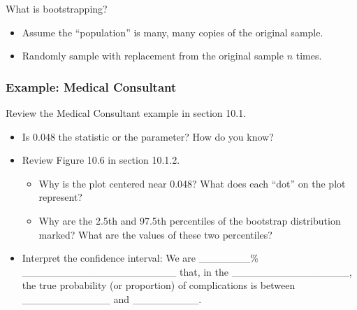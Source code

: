 \documentclass[
]{report}
\providecommand{\tightlist}{%
  \setlength{\itemsep}{0pt}\setlength{\parskip}{0pt}}
\begin{document}
What is bootstrapping?

\begin{itemize}
\item
  Assume the ``population'' is many, many copies of the original sample.
\item
  Randomly sample with replacement from the original sample \(n\) times.
\end{itemize}

\subsubsection*{Example: Medical Consultant}\label{example-medical-consultant}

Review the Medical Consultant example in section 10.1.

\begin{itemize}
\tightlist
\item
  Is 0.048 the statistic or the parameter? How do you know?
\end{itemize}

\vspace{0.4in}

\begin{itemize}
\item
  Review Figure 10.6 in section 10.1.2.

  \begin{itemize}
  \tightlist
  \item
    Why is the plot centered near 0.048? What does each ``dot'' on the plot represent?
  \end{itemize}

  \vspace{0.4in}

  \begin{itemize}
  \tightlist
  \item
    Why are the 2.5th and 97.5th percentiles of the bootstrap distribution marked? What are the values of these two percentiles?
  \end{itemize}

  \vspace{0.3in}
\end{itemize}


\begin{itemize}
\tightlist
\item
  Interpret the confidence interval: We are \_\_\_\_\_\_\_\% \_\_\_\_\_\_\_\_\_\_\_\_\_\_\_\_\_\_\_\_\_ that, in the \_\_\_\_\_\_\_\_\_\_\_\_\_\_\_\_, the true probability (or proportion) of complications is between \_\_\_\_\_\_\_\_\_\_\_\_ and \_\_\_\_\_\_\_\_\_.
\end{itemize}
\end{document}
